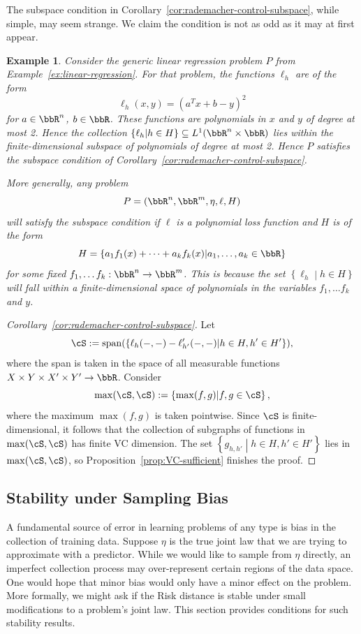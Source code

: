 \documentclass[twoside,11pt]{article}
\newtheorem{examples}[theorem]{Example}
\newcommand{\set}[2]{\left\{ #1\middle| #2\right\}}
\begin{document}
The subspace condition in Corollary~\ref{cor:rademacher-control-subspace}, while simple, may seem strange. We claim the condition is not as odd as it may at first appear.
\begin{examples}
    Consider the generic linear regression problem $P$ from Example~\ref{ex:linear-regression}. For that problem, the functions $\ell_h$ are of the form
    \[\ell_h(x,y) = (a^Tx + b - y)^2\]
    for $a\in \bbR^n$, $b\in \bbR$. These functions are polynomials in $x$ and $y$ of degree at most 2. Hence the collection $\set{\ell_h}{h\in H}\subseteq L^1(\bbR^n\times \bbR)$ lies within the finite-dimensional subspace of polynomials of degree at most 2. Hence $P$ satisfies the subspace condition of Corollary~\ref{cor:rademacher-control-subspace}.

    More generally, any problem
    \[P = (\bbR^n, \bbR^m, \eta, \ell, H)\]
    will satisfy the subspace condition if $\ell$ is a polynomial loss function and $H$ is of the form
    \[H = \set{a_1 f_1(x) + \dots + a_k f_k(x)}{a_1,\dots,a_k \in \bbR}\]
    for some fixed $f_1,\dots f_k:\bbR^n\to \bbR^m$. This is because the set $\set{\ell_h}{h\in H}$ will fall within a finite-dimensional space of polynomials in the variables $f_1,\dots f_k$ and $y$.
\end{examples}

\begin{proof}[Corollary~\ref{cor:rademacher-control-subspace}]
    Let
    \[\cS:= \mathrm{span}(\set{\ell_h(-,-) - \ell'_{h'}(-,-)}{h\in H, h'\in H'}),\]
    where the span is taken in the space of all measurable functions $X\times Y \times X' \times Y' \to \bbR$. Consider
    \[\max(\cS,\cS) := \set{\max(f,g)}{f,g\in \cS},\]
    where the maximum $\max(f,g)$ is taken pointwise. Since $\cS$ is finite-dimensional, it follows \citep[Lemma 2.6.15 and Lemma 2.6.18(ii)]{van_der_vaart_weak_1996} that the collection of subgraphs of functions in $\max(\cS,\cS)$ has finite VC dimension.  The set $\set{g_{h,h'}}{h\in H, h'\in H'}$ lies in $\max(\cS,\cS)$, so Proposition~\ref{prop:VC-sufficient} finishes the proof.
\end{proof}

\subsection{Stability under Sampling Bias}\label{subsec:stability-bias}
        A fundamental source of error in learning problems of any type is bias in the collection of training data. Suppose $\eta$ is the true joint law that we are trying to approximate with a predictor. While we would like to sample from $\eta$ directly, an imperfect collection process may over-represent certain regions of the data space. One would hope that minor bias would only have a minor effect on the problem. More formally, we might ask if the Risk distance is stable under small modifications to a problem's joint law. This section provides conditions for such stability results.
\end{document}
